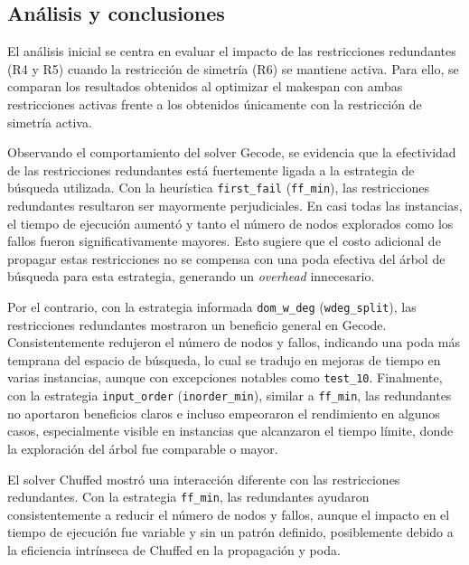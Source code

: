 
\subsection{Análisis y conclusiones}\label{sec:01-jobshop_mantenimiento-analisis-y-conclusiones}

El análisis inicial se centra en evaluar el impacto de las restricciones redundantes (R4 y R5) cuando la restricción de simetría (R6) se mantiene activa. Para ello, se comparan los resultados obtenidos al optimizar el makespan con ambas restricciones activas frente a los obtenidos únicamente con la restricción de simetría activa.

Observando el comportamiento del solver Gecode, se evidencia que la efectividad de las restricciones redundantes está fuertemente ligada a la estrategia de búsqueda utilizada. Con la heurística \texttt{first\_fail} (\texttt{ff\_min}), las restricciones redundantes resultaron ser mayormente perjudiciales. En casi todas las instancias, el tiempo de ejecución aumentó y tanto el número de nodos explorados como los fallos fueron significativamente mayores. Esto sugiere que el costo adicional de propagar estas restricciones no se compensa con una poda efectiva del árbol de búsqueda para esta estrategia, generando un \textit{overhead} innecesario.

Por el contrario, con la estrategia informada \texttt{dom\_w\_deg} (\texttt{wdeg\_split}), las restricciones redundantes mostraron un beneficio general en Gecode. Consistentemente redujeron el número de nodos y fallos, indicando una poda más temprana del espacio de búsqueda, lo cual se tradujo en mejoras de tiempo en varias instancias, aunque con excepciones notables como \texttt{test\_10}. Finalmente, con la estrategia \texttt{input\_order} (\texttt{inorder\_min}), similar a \texttt{ff\_min}, las redundantes no aportaron beneficios claros e incluso empeoraron el rendimiento en algunos casos, especialmente visible en instancias que alcanzaron el tiempo límite, donde la exploración del árbol fue comparable o mayor.

El solver Chuffed mostró una interacción diferente con las restricciones redundantes. Con la estrategia \texttt{ff\_min}, las redundantes ayudaron consistentemente a reducir el número de nodos y fallos, aunque el impacto en el tiempo de ejecución fue variable y sin un patrón definido, posiblemente debido a la eficiencia intrínseca de Chuffed en la propagación y poda.

